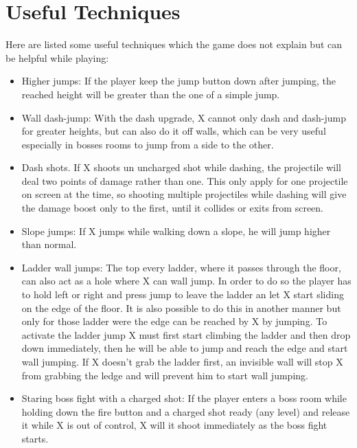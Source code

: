 \section{Useful Techniques}
Here are listed some useful techniques which the game does not explain but can be helpful while playing\cite{RTA_wiki:X1}: %
\begin{itemize}
	\item Higher jumps: If the player keep the jump button down after jumping, the reached height will be greater than the one of a simple jump.
	
	\item Wall dash-jump: With the dash upgrade, X cannot only dash and dash-jump for greater heights, but can also do it off walls, which can be very useful especially in bosses rooms to jump from a side to the other.
	
	\item Dash shots. If X shoots un uncharged shot while dashing, the projectile will deal two points of damage rather than one. This only apply for one projectile on screen at the time, so shooting multiple projectiles while dashing will give the damage boost only to the first, until it collides or exits from screen.
	
	\item Slope jumps: If X jumps while walking down a slope, he will jump higher than normal.
	
	\item Ladder wall jumps: The top every ladder, where it passes through the floor, can also act as a hole where X can wall jump. In order to do so the player has to hold left or right and press jump to leave the ladder an let X start sliding on the edge of the floor. It is also possible to do this in another manner but only for those ladder were the edge can be reached by X by jumping. To activate the ladder jump X must first start climbing the ladder and then drop down immediately, then he will be able to jump and reach the edge and start wall jumping. If X doesn't grab the ladder first, an invisible wall will stop X from grabbing the ledge and will prevent him to start wall jumping.
	
	\item Staring boss fight with a charged shot: If the player enters a boss room while holding down the fire button and a charged shot ready (any level) and release it while X is out of control, X will it shoot immediately as the boss fight starts.
\end{itemize}

